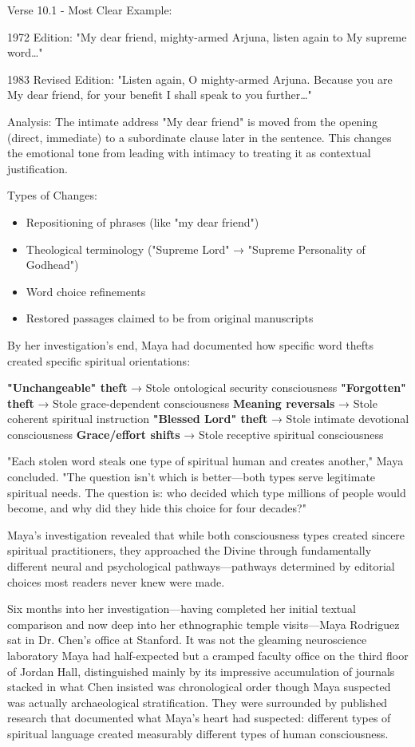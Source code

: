 \documentclass[12pt,twoside]{book}
\begin{document}
Verse 10.1 - Most Clear Example:

1972 Edition:
"My dear friend, mighty-armed Arjuna, listen again to My supreme word\ldots{}"

1983 Revised Edition:
"Listen again, O mighty-armed Arjuna. Because you are My dear friend, for your benefit I shall speak to you further\ldots{}"

Analysis: The intimate address "My dear friend" is moved from the opening (direct, immediate) to a subordinate clause later in the sentence. This changes the emotional tone from leading with intimacy to treating it as contextual justification.

Types of Changes:

\begin{itemize}
\item Repositioning of phrases (like "my dear friend")
\item Theological terminology ("Supreme Lord" → "Supreme Personality of
Godhead")
\item Word choice refinements
\item Restored passages claimed to be from original manuscripts
\end{itemize}


By her investigation's end, Maya had documented how specific word thefts created specific spiritual orientations:

\textbf{\textbf{"Unchangeable" theft}} → Stole ontological security consciousness
\textbf{\textbf{"Forgotten" theft}} → Stole grace-dependent consciousness  
\textbf{\textbf{Meaning reversals}} → Stole coherent spiritual instruction
\textbf{\textbf{"Blessed Lord" theft}} → Stole intimate devotional consciousness
\textbf{\textbf{Grace/effort shifts}} → Stole receptive spiritual consciousness

"Each stolen word steals one type of spiritual human and creates another," Maya concluded. "The question isn't which is better—both types serve legitimate spiritual needs. The question is: who decided which type millions of people would become, and why did they hide this choice for four decades?"

Maya's investigation revealed that while both consciousness types created sincere spiritual practitioners, they approached the Divine through fundamentally different neural and psychological pathways—pathways determined by editorial choices most readers never knew were made.

Six months into her investigation—having completed her initial textual comparison and now deep into her ethnographic temple visits—Maya Rodriguez sat in Dr. Chen's office at Stanford. It was not the gleaming neuroscience laboratory Maya had half-expected but a cramped faculty office on the third floor of Jordan Hall, distinguished mainly by its impressive accumulation of journals stacked in what Chen insisted was chronological order though Maya suspected was actually archaeological stratification. They were surrounded by published research that documented what Maya's heart had suspected: different types of spiritual language created measurably different types of human consciousness.
\end{document}
